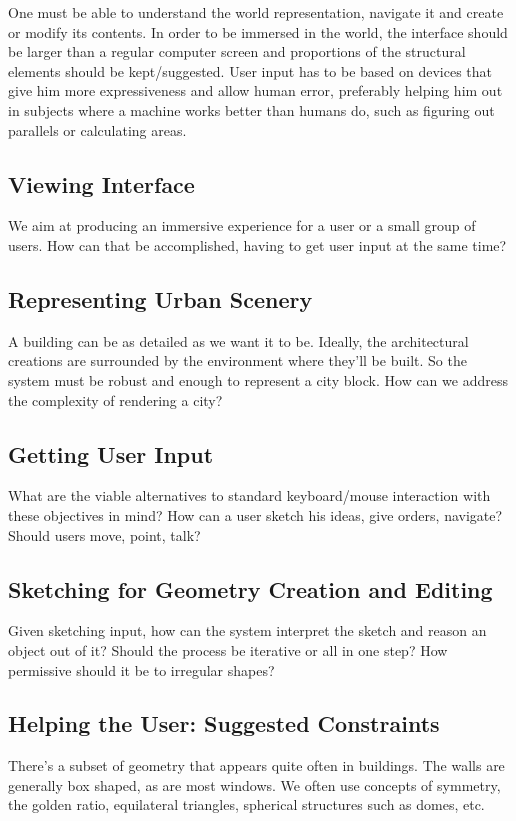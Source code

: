 One must be able to understand the world representation, navigate it and create or modify its contents.
In order to be immersed in the world, the interface should be larger than a regular computer screen
and proportions of the structural elements should be kept/suggested.
User input has to be based on devices that give him more expressiveness and allow human error,
preferably helping him out in subjects where a machine works better than humans do,
such as figuring out parallels or calculating areas.


\subsection{Viewing Interface}
We aim at producing an immersive experience for a user or a small group of users.
How can that be accomplished, having to get user input at the same time?


\subsection{Representing Urban Scenery}
A building can be as detailed as we want it to be.
Ideally, the architectural creations are surrounded by the environment
where they'll be built. So the system must be robust and enough to represent a city block.
How can we address the complexity of rendering a city?


\subsection{Getting User Input}
What are the viable alternatives to standard keyboard/mouse interaction with these objectives in mind?
How can a user sketch his ideas, give orders, navigate? Should users move, point, talk?


\subsection{Sketching for Geometry Creation and Editing}
Given sketching input, how can the system interpret the sketch and reason an object out of it?
Should the process be iterative or all in one step?
How permissive should it be to irregular shapes?
 

\subsection{Helping the User: Suggested Constraints}
There's a subset of geometry that appears quite often in buildings.
The walls are generally box shaped, as are most windows. We often use concepts of symmetry,
the golden ratio, equilateral triangles, spherical structures such as domes, etc.

